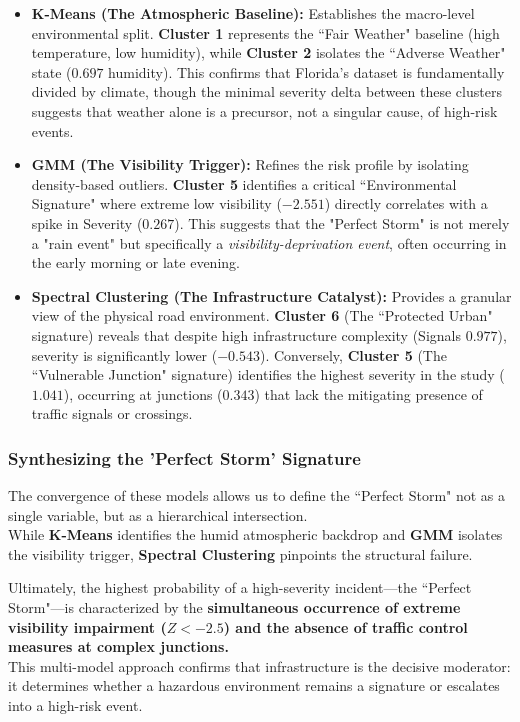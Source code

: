 \documentclass[conference]{IEEEtran}
\begin{document}
\begin{itemize}
	\item \textbf{K-Means (The Atmospheric Baseline):} 
	Establishes the macro-level environmental split. \textbf{Cluster 1} represents the ``Fair Weather" baseline (high temperature, low humidity), while \textbf{Cluster 2} isolates the ``Adverse Weather" state ($0.697$ humidity). This confirms that Florida's dataset is fundamentally divided by climate, though the minimal severity delta between these clusters suggests that weather alone is a precursor, not a singular cause, of high-risk events.
	
	\item \textbf{GMM (The Visibility Trigger):} 
	Refines the risk profile by isolating density-based outliers. \textbf{Cluster 5} identifies a critical ``Environmental Signature" where extreme low visibility ($-2.551$) directly correlates with a spike in Severity ($0.267$). This suggests that the "Perfect Storm" is not merely a "rain event" but specifically a \textit{visibility-deprivation event}, often occurring in the early morning or late evening.
	
	\item \textbf{Spectral Clustering (The Infrastructure Catalyst):} 
	Provides a granular view of the physical road environment. \textbf{Cluster 6} (The ``Protected Urban" signature) reveals that despite high infrastructure complexity (Signals $0.977$), severity is significantly lower ($-0.543$). Conversely, \textbf{Cluster 5} (The ``Vulnerable Junction" signature) identifies the highest severity in the study ($1.041$), occurring at junctions ($0.343$) that lack the mitigating presence of traffic signals or crossings.
\end{itemize}

\vspace{8mm}

\subsubsection*{\textbf{Synthesizing the 'Perfect Storm' Signature}}

The convergence of these models allows us to define the ``Perfect Storm" not as a single variable, but as a hierarchical intersection.\\
\indent While \textbf{K-Means} identifies the humid atmospheric backdrop and \textbf{GMM} isolates the visibility trigger, \textbf{Spectral Clustering} pinpoints the structural failure. 

Ultimately, the highest probability of a high-severity incident—the ``Perfect Storm"—is characterized by the \textbf{simultaneous occurrence of extreme visibility impairment ($Z < -2.5$) and the absence of traffic control measures at complex junctions.}\\
\indent This multi-model approach confirms that infrastructure is the decisive moderator: it determines whether a hazardous environment remains a signature or escalates into a high-risk event.
\end{document}
